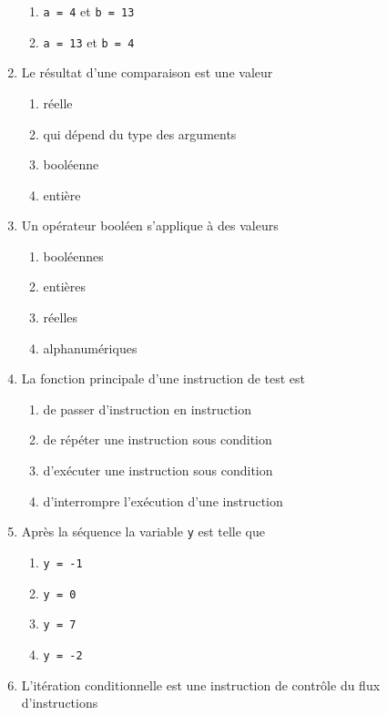 \begin{td}[QCM (2)]
\begin{enumerate}
\begin{enumerate}
	\item {\tt a = 4} et {\tt b = 13}
	\item {\tt a = 13} et {\tt b = 4}
	\end{enumerate}
\item Le résultat d'une comparaison est une valeur
	\begin{enumerate}
	\item réelle
	\item qui dépend du type des arguments 
	\item booléenne
	\item entière
	\end{enumerate}
\item Un opérateur booléen s'applique à des valeurs
	\begin{enumerate}
	\item booléennes
	\item entières
	\item réelles
	\item alphanumériques
	\end{enumerate}
\item La fonction principale d'une instruction de test est
	\begin{enumerate}
	\item de passer d'instruction en instruction
	\item de répéter une instruction sous condition
	\item d'exécuter une instruction sous condition
	\item d'interrompre l'exécution d'une instruction
	\end{enumerate}
\item Après la séquence  la variable {\tt y} est telle que
	\begin{enumerate}
	\item {\tt y = -1}
	\item {\tt y = 0}
	\item {\tt y = 7}
	\item {\tt y = -2}
	\end{enumerate}
\item L'itération conditionnelle est une instruction de contrôle du flux d'instructions 

\end{enumerate}
\end{td}
